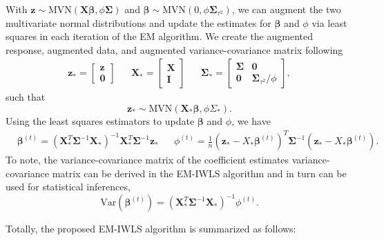 \documentclass[
]{article}
\begin{document}
With
\(\boldsymbol{z}\sim \text{MVN}(\boldsymbol{X} \boldsymbol{\beta}, \phi \boldsymbol{\Sigma})\)
and
\(\boldsymbol{\beta }\sim \text{MVN}(0, \phi \boldsymbol{\Sigma}_{\tau^2})\),
we can augment the two multivariate normal distributions and update the
estimates for \(\boldsymbol{\beta}\) and \(\phi\) via least squares in
each iteration of the EM algorithm. We create the augmented response,
augmented data, and augmented variance-covariance matrix following
\begin{align*}
& \boldsymbol{z}_* = \begin{bmatrix} \boldsymbol{z}\\ \boldsymbol{0}\end{bmatrix} &&
  \boldsymbol{X}_* = \begin{bmatrix} \boldsymbol{X} \\ \boldsymbol{I} \end{bmatrix} &&
  \boldsymbol{\Sigma}_* = \begin{bmatrix} \boldsymbol{\Sigma }& \boldsymbol{0}  \\ \boldsymbol{0} & \boldsymbol{\Sigma}_{\tau^2}/\phi \end{bmatrix}, &
\end{align*} such that \[
\boldsymbol{z}_* \sim \text{MVN}(\boldsymbol{X}_* \boldsymbol{\beta }, \phi \Sigma_*).
\] Using the least squares estimators to update \(\boldsymbol{\beta}\)
and \(\phi\), we have \begin{align*}
& \boldsymbol{\beta}^{(t)} = (\boldsymbol{X}_*^T \boldsymbol{\Sigma}^{-1} \boldsymbol{X}_*)^{-1}\boldsymbol{X}_*^T \boldsymbol{\Sigma}^{-1} \boldsymbol{z}_* && \phi^{(t)} = \frac{1}{n}(\boldsymbol{z}_*-X_*\boldsymbol{\beta}^{(t)})^T\boldsymbol{\Sigma}^{-1}(\boldsymbol{z}_*-X_*\boldsymbol{\beta}^{(t)}).&
\end{align*} To note, the variance-covariance matrix of the coefficient
estimates variance-covariance matrix can be derived in the EM-IWLS
algorithm and in turn can be used for statistical inferences, \[
  \text{Var}(\boldsymbol{\beta}^{(t)}) = (\boldsymbol{X}_*^T\boldsymbol{\Sigma}^{-1} \boldsymbol{X}_*)^{-1}\phi^{(t)}.
\]

Totally, the proposed EM-IWLS algorithm is summarized as follows:
\end{document}
